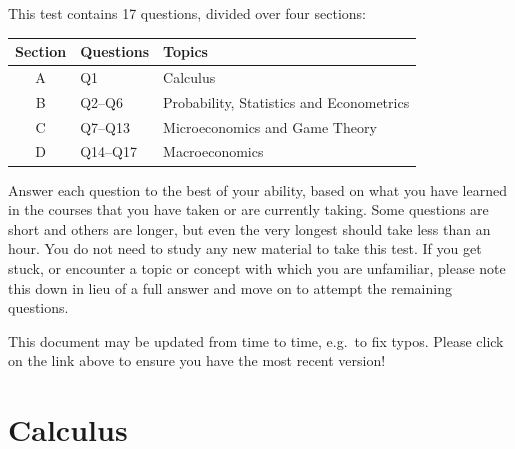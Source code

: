 \documentclass[addpoints,12pt,a4paper]{exam}
\begin{document}
This test contains 17 questions, divided over four sections:

\vspace{-1em}

\begin{center}
  \begin{tabular}[h]{cll}
  \textbf{Section} & \textbf{Questions} & \textbf{Topics}\\
    \hline
    A & Q1 & Calculus\\ %
    B & Q2--Q6 &%
        Probability, Statistics and Econometrics\\
    C & Q7--Q13 & Microeconomics and Game Theory\\    
    D & Q14--Q17 & Macroeconomics\\

  \end{tabular}
\end{center}

Answer each question to the best of your ability, based on what you have learned in the courses that you have taken or are currently taking. Some questions are short and others are longer, but even the very longest should take less than an hour. You do not need to study any new material to take this test.  If you get stuck, or encounter a topic or concept with which you are unfamiliar, please note this down in lieu of a full answer and move on to attempt the remaining questions.

This document may be updated from time to time, e.g.\ to fix typos. Please click on the link above to ensure you have the most recent version!







\newpage


\section{Calculus} %
\end{document}
